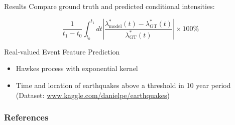 \documentclass{beamer}
\begin{document}
    

    

\begin{frame}{Results}
    Compare ground truth and predicted conditional intensities:

    $$\frac1{t_1-t_0}\int_{t_0}^{t_1}dt\left|\frac{\lambda_{\mathrm{model}}^*(t)-\lambda_{\mathrm{GT}}^*(t)}{\lambda_{\mathrm{GT}}^*(t)}\right|\times100\%$$
\end{frame}

\begin{frame}{Real-valued Event Feature Prediction}
    \begin{itemize}
        \item Hawkes process with exponential kernel

        \item Time and location of earthquakes above a threshold in 10 year period (Dataset: \url{www.kaggle.com/danielpe/earthquakes})
    \end{itemize}
    
\end{frame}

\begin{frame}[allowframebreaks]
    \frametitle{References}
    \nocite{*}
    \printbibliography
\end{frame}
\end{document}
